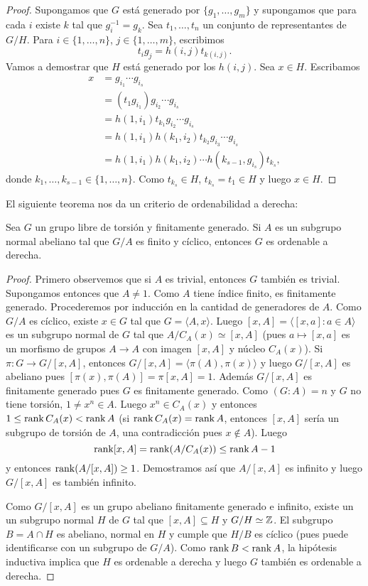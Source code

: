\begin{proof}
	Supongamos que $G$ está generado por $\{g_1,\dots,g_m\}$ y supongamos que
	para cada $i$ existe $k$ tal que $g_i^{-1}=g_k$. Sea $t_1,\dots,t_n$ un
	conjunto de representantes de $G/H$. Para $i\in\{1,\dots,n\}$,
	$j\in\{1,\dots,m\}$, escribimos
	\[
		t_ig_j=h(i,j)t_{k(i,j)}.
	\]
	Vamos a demostrar que $H$ está generado por los $h(i,j)$. Sea $x\in H$.
	Escribamos 
	\begin{align*}
	x &=g_{i_1}\cdots g_{i_s}\\
	&= (t_1g_{i_1})g_{i_2}\cdots g_{i_s}\\
	&= h(1,i_1)t_{k_1}g_{i_2}\cdots g_{i_s}\\
	&= h(1,i_1)h(k_1,i_2)t_{k_2}g_{i_3}\cdots g_{i_s}\\
	&= h(1,i_1)h(k_1,i_2)\cdots h(k_{s-1},g_{i_s})t_{k_s},
	\end{align*}
	donde $k_1,\dots,k_{s-1}\in\{1,\dots,n\}$. Como $t_{k_s}\in H$,
	$t_{k_s}=t_1\in H$ y luego $x\in H$.
\end{proof}

El siguiente teorema nos da un criterio de ordenabilidad a derecha:

\begin{theorem}
	Sea $G$ un grupo libre de torsión y finitamente generado. Si $A$ es un
	subgrupo normal abeliano tal que $G/A$ es finito y cíclico, entonces $G$ es
	ordenable a derecha.
\end{theorem}

\begin{proof}
	Primero observemos que si $A$ es trivial, entonces $G$ también es trivial.
Supongamos entonces que $A\ne 1$.  Como $A$ tiene índice finito, es finitamente
generado. Procederemos por inducción en la cantidad de generadores de $A$. Como
$G/A$ es cíclico, existe $x\in G$ tal que $G=\langle A,x\rangle$. Luego
$[x,A]=\langle [x,a]:a\in A\rangle$ es un subgrupo normal de $G$ tal que
$A/C_A(x)\simeq [x,A]$ (pues $a\mapsto [x,a]$ es un morfismo de grupos $A\to A$
con imagen $[x,A]$ y núcleo $C_A(x)$). Si $\pi\colon G\to G/[x,A]$, entonces
$G/[x,A]=\langle \pi(A),\pi(x)\rangle$ y luego $G/[x,A]$ es abeliano pues
$[\pi(x),\pi(A)]=\pi[x,A]=1$. Además $G/[x,A]$ es finitamente generado pues $G$
es finitamente generado. Como $(G:A)=n$ y $G$ no tiene torsión, $1\ne x^n\in
A$.  Luego $x^n\in C_A(x)$ y entonces $1\leq \operatorname{rank} C_A(x)<\operatorname{rank} A$ (si $\operatorname{rank}
C_A(x)=\operatorname{rank} A$, entonces $[x,A]$ sería un subgrupo de torsión de $A$, una
contradicción pues $x\not\in A$).  Luego 
\[
\operatorname{rank}[x,A]=\operatorname{rank} (A/C_A(x))\leq\operatorname{rank} A-1
\]
y entonces $\operatorname{rank} (A/[x,A])\geq 1$. Demostramos así que $A/[x,A]$ es infinito y
luego $G/[x,A]$ es también infinito. 

Como $G/[x,A]$ es un grupo abeliano finitamente generado e infinito, existe un
un subgrupo normal $H$ de $G$ tal que $[x,A]\subseteq H$ y $G/H\simeq\mathbb{Z}$. El
subgrupo $B=A\cap H$ es abeliano, normal en $H$ y cumple que $H/B$ es cíclico
(pues puede identificarse con un subgrupo de $G/A$). Como $\operatorname{rank} B<\operatorname{rank} A$, la
hipótesis inductiva implica que $H$ es ordenable a derecha y luego $G$ también
es ordenable a derecha.
\end{proof}

